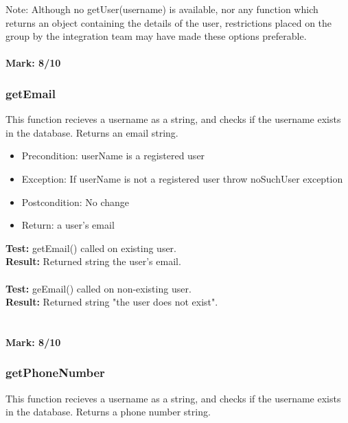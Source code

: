 \documentclass[12pt]{article}
\begin{document}
	
	\noindent Note: Although no getUser(username) is available, nor any function which returns an object containing the details of the user, restrictions placed on the group by the 			integration team may have made these options preferable.\\ \\ \textbf{Mark: 8/10}
	
	
	\subsubsection{getEmail}
		This function recieves a username as a string, and checks if the username exists in the database. Returns an email string.
	
	\begin{itemize}
		\item Precondition: userName is a registered user
		\item Exception: If userName is not a registered user throw noSuchUser exception
		\item Postcondition: No change
		\item Return: a user's email
	\end{itemize}
		
	\noindent \textbf{Test:} getEmail() called on existing user.\\
	\textbf{Result:} Returned string the user's email.\\\\
	\textbf{Test:} geEmail() called on non-existing user.\\
	\textbf{Result:} Returned string "the user does not exist".\\
	\\ \\
	\textbf{Mark: 8/10}
	
	
	\subsubsection{getPhoneNumber}
		This function recieves a username as a string, and checks if the username exists in the database. Returns a phone number string.
	
\end{document}
